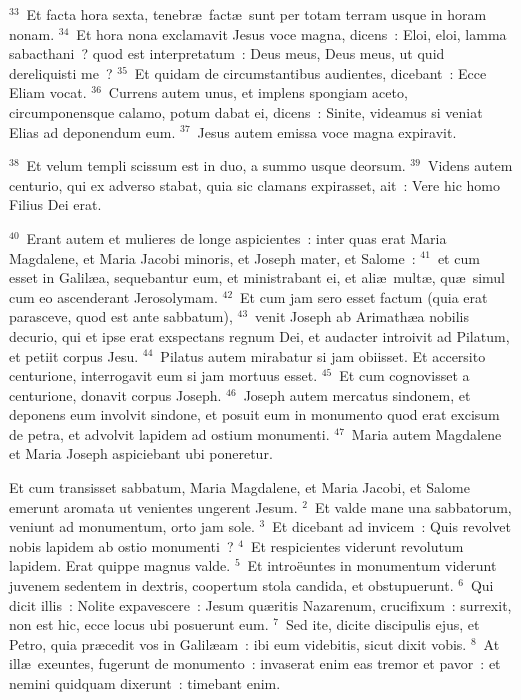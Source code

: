 ${}^{33}$~Et facta hora sexta, tenebr\ae\ fact\ae\ sunt per totam terram usque in horam nonam.
${}^{34}$~Et hora nona exclamavit Jesus voce magna, dicens~: Eloi, eloi, lamma sabacthani~? quod est interpretatum~: Deus meus, Deus meus, ut quid dereliquisti me~?
${}^{35}$~Et quidam de circumstantibus audientes, dicebant~: Ecce Eliam vocat.
${}^{36}$~Currens autem unus, et implens spongiam aceto, circumponensque calamo, potum dabat ei, dicens~: Sinite, videamus si veniat Elias ad deponendum eum.
${}^{37}$~Jesus autem emissa voce magna expiravit.


${}^{38}$~Et velum templi scissum est in duo, a summo usque deorsum.
${}^{39}$~Videns autem centurio, qui ex adverso stabat, quia sic clamans expirasset, ait~: Vere hic homo Filius Dei erat.


${}^{40}$~Erant autem et mulieres de longe aspicientes~: inter quas erat Maria Magdalene, et Maria Jacobi minoris, et Joseph mater, et Salome~:
${}^{41}$~et cum esset in Galil\ae a, sequebantur eum, et ministrabant ei, et ali\ae\ mult\ae , qu\ae\ simul cum eo ascenderant Jerosolymam.
${}^{42}$~Et cum jam sero esset factum (quia erat parasceve, quod est ante sabbatum),
${}^{43}$~venit Joseph ab Arimath\ae a nobilis decurio, qui et ipse erat exspectans regnum Dei, et audacter introivit ad Pilatum, et petiit corpus Jesu.
${}^{44}$~Pilatus autem mirabatur si jam obiisset. Et accersito centurione, interrogavit eum si jam mortuus esset.
${}^{45}$~Et cum cognovisset a centurione, donavit corpus Joseph.
${}^{46}$~Joseph autem mercatus sindonem, et deponens eum involvit sindone, et posuit eum in monumento quod erat excisum de petra, et advolvit lapidem ad ostium monumenti.
${}^{47}$~Maria autem Magdalene et Maria Joseph aspiciebant ubi poneretur.

\lettrine[lines=3,image=true,loversize=0.05,lraise=-0.03]{E}{}t cum transisset sabbatum, Maria Magdalene, et Maria Jacobi, et Salome emerunt aromata ut venientes ungerent Jesum.
${}^{2}$~Et valde mane una sabbatorum, veniunt ad monumentum, orto jam sole.
${}^{3}$~Et dicebant ad invicem~: Quis revolvet nobis lapidem ab ostio monumenti~?
${}^{4}$~Et respicientes viderunt revolutum lapidem. Erat quippe magnus valde.
${}^{5}$~Et intro\"euntes in monumentum viderunt juvenem sedentem in dextris, coopertum stola candida, et obstupuerunt.
${}^{6}$~Qui dicit illis~: Nolite expavescere~: Jesum qu\ae ritis Nazarenum, crucifixum~: surrexit, non est hic, ecce locus ubi posuerunt eum.
${}^{7}$~Sed ite, dicite discipulis ejus, et Petro, quia pr\ae cedit vos in Galil\ae am~: ibi eum videbitis, sicut dixit vobis.
${}^{8}$~At ill\ae\ exeuntes, fugerunt de monumento~: invaserat enim eas tremor et pavor~: et nemini quidquam dixerunt~: timebant enim.


